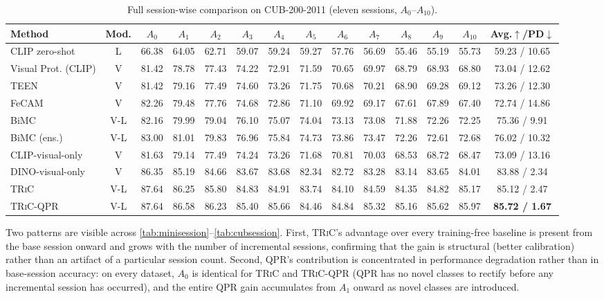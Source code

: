 \documentclass{iutbscthesis}
\begin{document}
\begin{table}[H]
    \centering
    \small
    \begin{tabular}{l c c c c c c c c c c c c c}
        \toprule
        Method & Mod. & $A_0$ & $A_1$ & $A_2$ & $A_3$ & $A_4$ & $A_5$ & $A_6$ & $A_7$ & $A_8$ & $A_9$ & $A_{10}$ & Avg.$\uparrow$/PD$\downarrow$ \\
        \midrule
        CLIP zero-shot & L & 66.38 & 64.05 & 62.71 & 59.07 & 59.24 & 59.27 & 57.76 & 56.69 & 55.46 & 55.19 & 55.73 & 59.23 / 10.65 \\
        Visual Prot. (CLIP) & V & 81.42 & 78.78 & 77.43 & 74.22 & 72.91 & 71.59 & 70.65 & 69.97 & 68.79 & 68.93 & 68.80 & 73.04 / 12.62 \\
        TEEN & V & 81.42 & 79.16 & 77.49 & 74.60 & 73.26 & 71.75 & 70.68 & 70.21 & 68.90 & 69.28 & 69.12 & 73.26 / 12.30 \\
        FeCAM & V & 82.26 & 79.48 & 77.76 & 74.68 & 72.86 & 71.10 & 69.92 & 69.17 & 67.61 & 67.89 & 67.40 & 72.74 / 14.86 \\
        BiMC & V-L & 82.16 & 79.99 & 79.04 & 76.10 & 75.07 & 74.04 & 73.13 & 73.08 & 71.88 & 72.26 & 72.25 & 75.36 / 9.91 \\
        BiMC (ens.) & V-L & 83.00 & 81.01 & 79.83 & 76.96 & 75.84 & 74.73 & 73.86 & 73.47 & 72.26 & 72.61 & 72.68 & 76.02 / 10.32 \\
        CLIP-visual-only & V & 81.63 & 79.14 & 77.49 & 74.24 & 73.26 & 71.68 & 70.81 & 70.03 & 68.53 & 68.72 & 68.47 & 73.09 / 13.16 \\
        DINO-visual-only & V & 86.35 & 85.19 & 84.66 & 83.67 & 83.68 & 82.34 & 82.72 & 83.28 & 83.14 & 83.65 & 84.01 & 83.88 / 2.34 \\
        \textsc{TRiC} & V-L & 87.64 & 86.25 & 85.80 & 84.83 & 84.91 & 83.74 & 84.10 & 84.59 & 84.35 & 84.82 & 85.17 & 85.12 / 2.47 \\
        \textsc{TRiC}-QPR & V-L & 87.64 & 86.58 & 86.23 & 85.40 & 85.66 & 84.46 & 84.84 & 85.32 & 85.16 & 85.62 & 85.97 & \textbf{85.72 / 1.67} \\
        \bottomrule
    \end{tabular}
    \caption{Full session-wise comparison on CUB-200-2011 (eleven sessions, $A_0$--$A_{10}$).}
    \label{tab:cubsession}
\end{table}

Two patterns are visible across \autoref{tab:minisession}--\autoref{tab:cubsession}. First, \textsc{TRiC}'s advantage over every training-free baseline is present from the base session onward and grows with the number of incremental sessions, confirming that the gain is structural (better calibration) rather than an artifact of a particular session count. Second, QPR's contribution is concentrated in performance degradation rather than in base-session accuracy: on every dataset, $A_0$ is identical for \textsc{TRiC} and \textsc{TRiC}-QPR (QPR has no novel classes to rectify before any incremental session has occurred), and the entire QPR gain accumulates from $A_1$ onward as novel classes are introduced.
\end{document}
